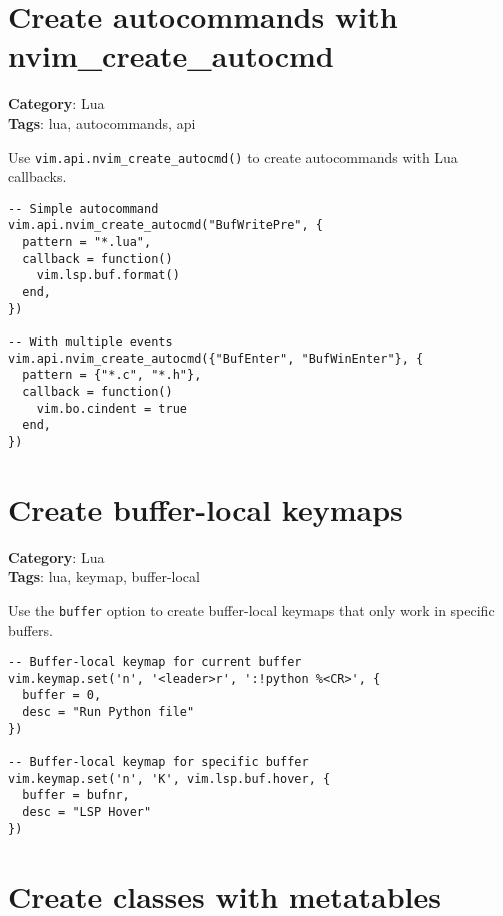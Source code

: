 {{{{{{\section{Create autocommands with nvim\_create\_autocmd}

\textbf{Category}: Lua\\ \textbf{Tags}: lua, autocommands, api
\vspace{0.5cm}

Use {\footnotesize \Verb§vim.api.nvim_create_autocmd()§} to create autocommands with Lua callbacks.

\begin{Exa*}{}
\begin{Verbatim}[fontsize=\footnotesize, breaklines, breakanywhere]
-- Simple autocommand
vim.api.nvim_create_autocmd("BufWritePre", {
  pattern = "*.lua",
  callback = function()
    vim.lsp.buf.format()
  end,
})

-- With multiple events
vim.api.nvim_create_autocmd({"BufEnter", "BufWinEnter"}, {
  pattern = {"*.c", "*.h"},
  callback = function()
    vim.bo.cindent = true
  end,
})
\end{Verbatim}
\end{Exa*}

\section{Create buffer-local keymaps}

\textbf{Category}: Lua\\ \textbf{Tags}: lua, keymap, buffer-local
\vspace{0.5cm}

Use the {\footnotesize \Verb§buffer§} option to create buffer-local keymaps that only work in specific buffers.

\begin{Exa*}{}
\begin{Verbatim}[fontsize=\footnotesize, breaklines, breakanywhere]
-- Buffer-local keymap for current buffer
vim.keymap.set('n', '<leader>r', ':!python %<CR>', {
  buffer = 0,
  desc = "Run Python file"
})

-- Buffer-local keymap for specific buffer
vim.keymap.set('n', 'K', vim.lsp.buf.hover, {
  buffer = bufnr,
  desc = "LSP Hover"
})
\end{Verbatim}
\end{Exa*}

\section{Create classes with metatables}

}}}}}}

